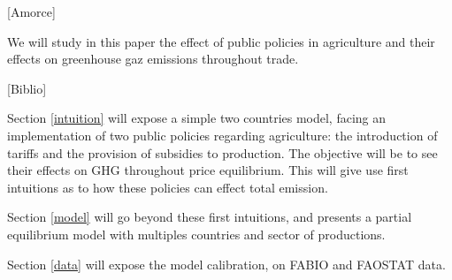 [Amorce]

We will study in this paper the effect of public policies in agriculture and their effects on greenhouse gaz emissions throughout trade.

[Biblio]

Section \ref{intuition} will expose a simple two countries model, facing an implementation of two public policies regarding agriculture: the introduction of tariffs and the provision of subsidies to production. The objective will be to see their effects on GHG throughout price equilibrium. This will give use first intuitions as to how these policies can effect total emission.

Section \ref{model} will go beyond these first intuitions, and presents a partial equilibrium model with multiples countries and sector of productions. 

Section \ref{data} will expose the model calibration, on FABIO and FAOSTAT data.

